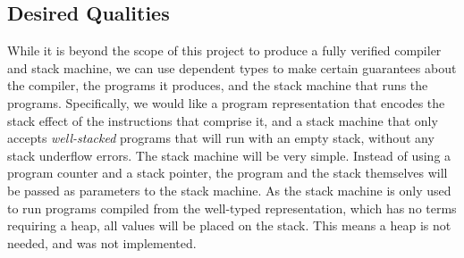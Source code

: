 \subsection{Desired Qualities}
While it is beyond the scope of this project to produce a fully verified compiler and stack machine, we can use dependent types to make certain guarantees about the compiler, the programs it produces, and the stack machine that runs the programs. Specifically, we would like a program representation that encodes the stack effect of the instructions that comprise it, and a stack machine that only accepts \textit{well-stacked} programs that will run with an empty stack, without any stack underflow errors. The stack machine will be very simple. Instead of using a program counter and a stack pointer, the program and the stack themselves will be passed as parameters to the stack machine. As the stack machine is only used to run programs compiled from the well-typed representation, which has no terms requiring a heap, all values will be placed on the stack. This means a heap is not needed, and was not implemented.





